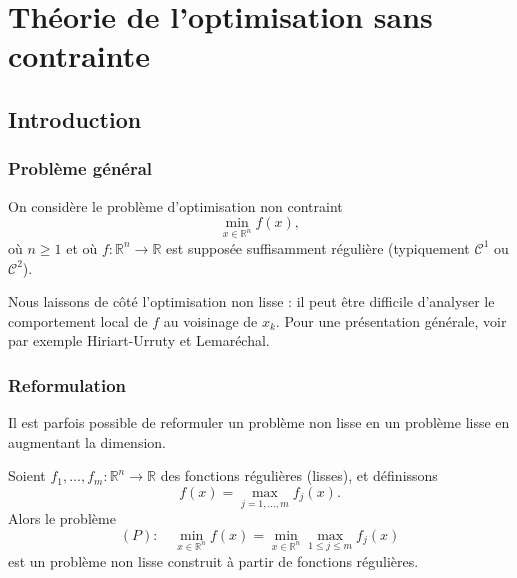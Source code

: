 
\chapter{Théorie de l’optimisation sans contrainte}

\section{Introduction}
\label{sec:2.1}

\subsection{Problème général}
\label{subsec:2.1.1}

On considère le problème d’optimisation non contraint
\begin{equation}
    \min_{x \in \mathbb{R}^n} f(x),
\end{equation}
où $n \geq 1$ et où $f : \mathbb{R}^n \to \mathbb{R}$ est supposée suffisamment régulière
(typiquement $\mathcal{C}^1$ ou $\mathcal{C}^2$).

\begin{remarque}
Nous laissons de côté l’optimisation non lisse : il peut être difficile d’analyser le
comportement local de $f$ au voisinage de $x_k$. Pour une présentation générale,
voir par exemple Hiriart-Urruty et Lemaréchal.
\end{remarque}

\subsection{Reformulation}
\label{subsec:2.1.2}

Il est parfois possible de reformuler un problème non lisse en un problème lisse
en augmentant la dimension.

Soient $f_1,\dots,f_m : \mathbb{R}^n \to \mathbb{R}$ des fonctions régulières (lisses), et définissons
\begin{equation}
    f(x) = \max_{j=1,\dots,m} f_j(x).
\end{equation}
Alors le problème
\begin{equation}
    (P) :\quad \min_{x \in \mathbb{R}^n} f(x)
        = \min_{x \in \mathbb{R}^n} \max_{1 \le j \le m} f_j(x)
\end{equation}
est un problème non lisse construit à partir de fonctions régulières.

